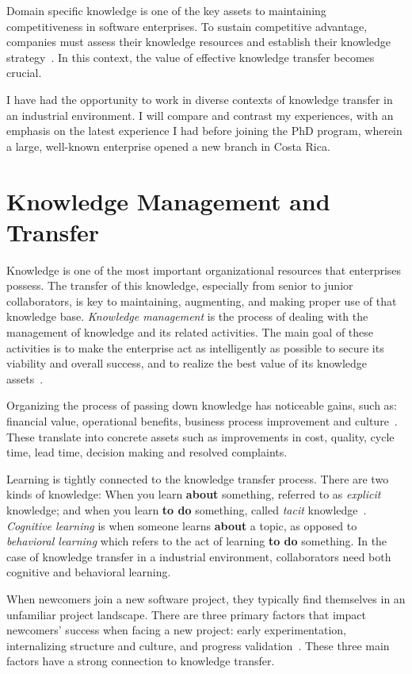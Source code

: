 \documentclass[12pt, letterpaper]{article}
\begin{document}
Domain specific knowledge is one of the key assets to maintaining competitiveness in 
software enterprises.
To sustain competitive advantage, companies must assess their knowledge resources and 
establish their knowledge strategy~\cite{civi00}. In this context, the value of effective 
knowledge transfer 
becomes crucial. 

I have had the opportunity to work in diverse contexts of knowledge transfer in 
an industrial environment. I will compare and contrast my experiences, with an emphasis on the 
latest experience I had before joining the PhD program, wherein a large, well-known enterprise 
opened a new branch in Costa Rica.

\section{Knowledge Management and Transfer}
Knowledge is one of the most important organizational resources that enterprises possess.
The transfer of this knowledge, especially from senior to junior collaborators, 
is key to maintaining, augmenting, and
making proper use of that knowledge base. 
\textit{Knowledge management}
is the process of dealing with the management 
of knowledge and its related activities. 
The main goal of these activities is to make the enterprise act as intelligently as possible to secure its viability and overall success, and
to realize the best value of its knowledge assets~\cite{wiig97}.

Organizing the process of passing down knowledge has noticeable gains, 
such as: financial
value, operational benefits, business process improvement and culture~\cite{ibrahim09}. These translate into concrete assets such as
improvements in cost, quality, cycle time, lead time, decision making and resolved complaints.

Learning is tightly connected to the knowledge transfer
process.
There are two kinds of knowledge: When you learn \textbf{about} something, referred to as \textit{explicit} 
knowledge; and when you learn \textbf{to do} something, called \textit{tacit} knowledge~\cite{cook99}. 
\textit{Cognitive learning} is when someone learns \textbf{about} a topic, as opposed to 
\textit{behavioral learning} which refers to the act of learning \textbf{to do} something.
In the case of knowledge transfer in a industrial environment, collaborators need both cognitive and
behavioral learning.

When newcomers join a new software project, they typically find themselves in an
unfamiliar project
landscape.
There are three primary factors that impact newcomers'
success when facing a new project: early experimentation, internalizing structure
and culture, and progress validation~\cite{Dagenais10}. These three main factors
have a strong connection to knowledge transfer. 
\end{document}
